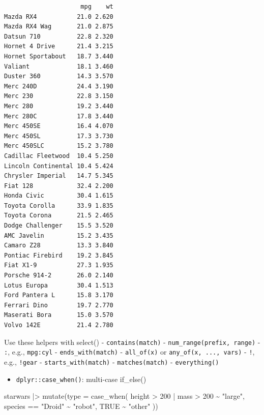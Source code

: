 \documentclass[
  letterpaper,
  DIV=11,
  numbers=noendperiod]{scrreprt}
\newenvironment{Shaded}{\begin{snugshade}}{\end{snugshade}}
\newcommand{\AttributeTok}[1]{\textcolor[rgb]{0.40,0.45,0.13}{#1}}
\newcommand{\ConstantTok}[1]{\textcolor[rgb]{0.56,0.35,0.01}{#1}}
\newcommand{\DecValTok}[1]{\textcolor[rgb]{0.68,0.00,0.00}{#1}}
\newcommand{\FunctionTok}[1]{\textcolor[rgb]{0.28,0.35,0.67}{#1}}
\newcommand{\NormalTok}[1]{\textcolor[rgb]{0.00,0.23,0.31}{#1}}
\newcommand{\SpecialCharTok}[1]{\textcolor[rgb]{0.37,0.37,0.37}{#1}}
\newcommand{\StringTok}[1]{\textcolor[rgb]{0.13,0.47,0.30}{#1}}
\providecommand{\tightlist}{%
  \setlength{\itemsep}{0pt}\setlength{\parskip}{0pt}}\usepackage{longtable,booktabs,array}
\begin{document}
\begin{verbatim}
                     mpg    wt
Mazda RX4           21.0 2.620
Mazda RX4 Wag       21.0 2.875
Datsun 710          22.8 2.320
Hornet 4 Drive      21.4 3.215
Hornet Sportabout   18.7 3.440
Valiant             18.1 3.460
Duster 360          14.3 3.570
Merc 240D           24.4 3.190
Merc 230            22.8 3.150
Merc 280            19.2 3.440
Merc 280C           17.8 3.440
Merc 450SE          16.4 4.070
Merc 450SL          17.3 3.730
Merc 450SLC         15.2 3.780
Cadillac Fleetwood  10.4 5.250
Lincoln Continental 10.4 5.424
Chrysler Imperial   14.7 5.345
Fiat 128            32.4 2.200
Honda Civic         30.4 1.615
Toyota Corolla      33.9 1.835
Toyota Corona       21.5 2.465
Dodge Challenger    15.5 3.520
AMC Javelin         15.2 3.435
Camaro Z28          13.3 3.840
Pontiac Firebird    19.2 3.845
Fiat X1-9           27.3 1.935
Porsche 914-2       26.0 2.140
Lotus Europa        30.4 1.513
Ford Pantera L      15.8 3.170
Ferrari Dino        19.7 2.770
Maserati Bora       15.0 3.570
Volvo 142E          21.4 2.780
\end{verbatim}

Use these helpers with select() - \texttt{contains(match)} -
\texttt{num\_range(prefix,\ range)} - \texttt{:}, e.g., \texttt{mpg:cyl}
- \texttt{ends\_with(match)} - \texttt{all\_of(x)} or
\texttt{any\_of(x,\ ...,\ vars)} - \texttt{!}, e.g., \texttt{!gear} -
\texttt{starts\_with(match)} - \texttt{matches(match)} -
\texttt{everything()}

\begin{itemize}
\tightlist
\item
  \texttt{dplyr::case\_when()}: multi-case if\_else()
\end{itemize}

\begin{Shaded}
\begin{Highlighting}[]
\NormalTok{starwars }\SpecialCharTok{|\textgreater{}}
  \FunctionTok{mutate}\NormalTok{(}\AttributeTok{type =} \FunctionTok{case\_when}\NormalTok{(}
\NormalTok{    height }\SpecialCharTok{\textgreater{}} \DecValTok{200} \SpecialCharTok{|}\NormalTok{ mass }\SpecialCharTok{\textgreater{}} \DecValTok{200} \SpecialCharTok{\textasciitilde{}} \StringTok{"large"}\NormalTok{,}
\NormalTok{    species }\SpecialCharTok{==} \StringTok{"Droid"} \SpecialCharTok{\textasciitilde{}} \StringTok{"robot"}\NormalTok{,}
    \ConstantTok{TRUE} \SpecialCharTok{\textasciitilde{}} \StringTok{"other"}
\NormalTok{  ))}
\end{Highlighting}
\end{Shaded}
\end{document}
